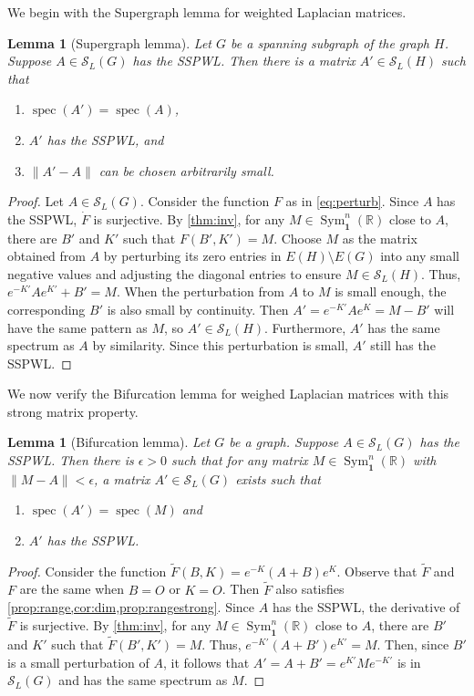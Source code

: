 \documentclass{article}
\newtheorem{lemma}[theorem]{Lemma}
\theoremstyle{definition}
\newcommand{\bone}{\mathbf{1}}
\newcommand{\spec}{\operatorname{spec}}
\newcommand{\msymz}[1][n]{\operatorname{Sym}_{\bone}^{#1}(\mathbb{R})}
\newcommand{\mptn}{\mathcal{S}}
\begin{document}
We begin with the Supergraph lemma for weighted Laplacian matrices.

\begin{lemma}[Supergraph lemma]
\label{lem:supergraph}
Let $G$ be a spanning subgraph of the graph $H$.  Suppose $A\in\mptn_L(G)$ has the SSPWL.  Then there is a matrix $A'\in\mptn_L(H)$ such that
\begin{enumerate}[label={\rm(\arabic*)}]
\item $\spec(A') = \spec(A)$, 
\item $A'$ has the SSPWL, and 
\item $\|A' - A\|$ can be chosen arbitrarily small.
\end{enumerate}
\end{lemma}
\begin{proof}
Let $A\in\mptn_L(G)$.  Consider the function $F$ as in \cref{eq:perturb}.  Since $A$ has the SSPWL, $\dot{F}$ is surjective.  By \cref{thm:inv}, for any $M\in\msymz$ close to $A$, there are $B'$ and $K'$ such that $F(B',K') = M$.  Choose $M$ as the matrix obtained from $A$ by perturbing its zero entries in $E(H)\setminus E(G)$ into any small negative values and adjusting the diagonal entries to ensure $M\in\mptn_L(H)$. Thus, $e^{-K'}Ae^{K'} + B' = M$.  When the perturbation from $A$ to $M$ is small enough, the corresponding $B'$ is also small by continuity.  Then $A' = e^{-K'}Ae^K = M - B'$ will have the same pattern as $M$, so $A'\in\mptn_L(H)$. Furthermore, $A'$ has the same spectrum as $A$ by similarity.  Since this perturbation is small, $A'$ still has the SSPWL.
\end{proof}

We now verify the Bifurcation lemma for weighed Laplacian matrices with this strong matrix property.

\begin{lemma}[Bifurcation lemma]
\label{lem:bifurcation}
Let $G$ be a graph.  Suppose $A\in\mptn_L(G)$ has the SSPWL.  Then there is $\epsilon > 0$ such that for any matrix $M\in\msymz$ with $\|M - A\| < \epsilon$, a matrix $A'\in\mptn_L(G)$ exists such that
\begin{enumerate}[label={\rm(\arabic*)}]
\item $\spec(A') = \spec(M)$ and 
\item $A'$ has the SSPWL.
\end{enumerate}
\end{lemma}
\begin{proof}
Consider the function $\tilde{F}(B,K) = e^{-K}(A + B)e^K$.  Observe that $\tilde{F}$ and $F$ are the same when $B = O$ or $K = O$.  Then $\tilde{F}$ also satisfies \cref{prop:range,cor:dim,prop:rangestrong}.  Since $A$ has the SSPWL, the derivative of $\tilde{F}$ is surjective.  By \cref{thm:inv}, for any $M\in\msymz$ close to $A$, there are $B'$ and $K'$ such that $\tilde{F}(B',K') = M$.  Thus, $e^{-K'}(A + B')e^{K'} = M$.  Then, since $B'$ is a small perturbation of $A$, it follows that $A' = A + B' = e^{K'}Me^{-K'}$ is in $\mptn_L(G)$ and has the same spectrum as $M$.  
\end{proof}
\end{document}
